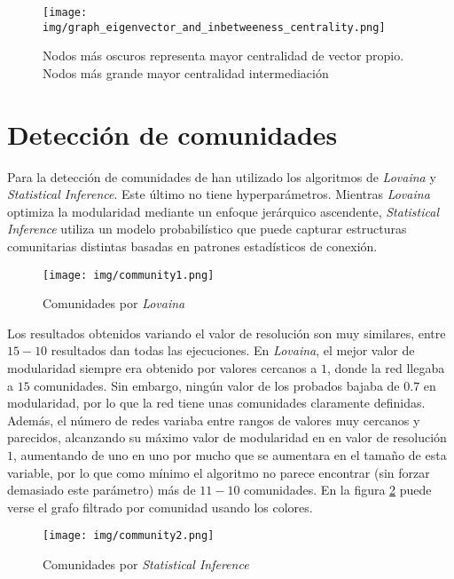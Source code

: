 \documentclass[12pt,letterpaper]{article}
\begin{document}
\begin{figure}[htp]
    \centering
    \texttt{[image: img/graph\_eigenvector\_and\_inbetweeness\_centrality.png]}
    \caption{Nodos más oscuros representa mayor centralidad de vector propio. Nodos más grande mayor centralidad intermediación}
    \label{fig:eigenvector_and_inbetweennes_centrality}
\end{figure}

\section{Detección de comunidades}
Para la detección de comunidades de han utilizado los algoritmos de \textit{Lovaina} y \textit{Statistical Inference}. Este último no tiene hyperparámetros. Mientras \textit{Lovaina} optimiza la modularidad mediante un enfoque jerárquico ascendente, \textit{Statistical Inference} utiliza un modelo probabilístico que puede capturar estructuras comunitarias distintas basadas en patrones estadísticos de conexión.

\begin{figure}[htp]
    \centering
    \texttt{[image: img/community1.png]}
    \caption{Comunidades por \textit{Lovaina}}
    \label{fig:communitylovaina}
\end{figure}

Los resultados obtenidos variando el valor de resolución son muy similares, entre $15-10$ resultados dan todas las ejecuciones. En \textit{Lovaina}, el mejor valor de modularidad siempre era obtenido por valores cercanos a $1$, donde la red llegaba a $15$ comunidades. Sin embargo, ningún valor de los probados bajaba de $0.7$ en modularidad, por lo que la red tiene unas comunidades claramente definidas. Además, el número de redes variaba entre rangos de valores muy cercanos y parecidos, alcanzando su máximo valor de modularidad en en valor de resolución $1$, aumentando de uno en uno por mucho que se aumentara en el tamaño de esta variable, por lo que como mínimo el algoritmo no parece encontrar (sin forzar demasiado este parámetro) más de $11-10$ comunidades. En la figura \ref{fig:communitylovaina} puede verse el grafo filtrado por comunidad usando los colores.


\begin{figure}[htp]
    \centering
    \texttt{[image: img/community2.png]}
    \caption{Comunidades por \textit{Statistical Inference}}
    \label{fig:communityinferred}
\end{figure}
\end{document}
